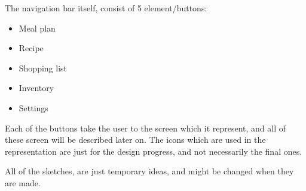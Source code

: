 The navigation bar itself, consist of 5 element/buttons:

\begin{itemize}
    \item Meal plan
    \item Recipe
    \item Shopping list
    \item Inventory
    \item Settings
\end{itemize}

Each of the buttons take the user to the screen which it represent, and all of these screen will be described later on. The icons which are used in the representation are just for the design progress, and not necessarily the final ones.

All of the sketches, are just temporary ideas, and might be changed when they are made.






